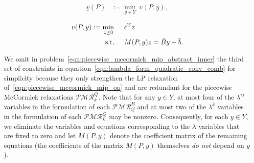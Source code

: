 \documentclass{article}
\newcommand{\pmc}{piecewise McCormick}
\begin{document}
\noindent
\begin{minipage}{0.2\linewidth}
\vspace*{0.5in}
\end{minipage}%
\hspace*{0.75in}
\begin{minipage}{0.3\linewidth}
\vspace*{-0.2in}
\begin{align}
\label{eqn:piecewise_mccormick_mip_abstract}
\underline{v}(P) &:= \min_{y \in Y} \: v(P,y),
\end{align}
\end{minipage}%
\hspace*{0.1in}
\begin{minipage}{0.45\linewidth}
\begin{alignat}{2}
\label{eqn:piecewise_mccormick_mip_abstract_inner}
v(P,y) &:= \min_{z \geq 0} \:\: && \bar{c}^{\textup{T}} z \\
&\quad\quad \text{s.t.} \:\: && M(P,y) z = \bar{B} y + \bar{b}. \nonumber
\end{alignat}
\end{minipage}

\vspace*{0.1in}
\noindent We omit in problem~\eqref{eqn:piecewise_mccormick_mip_abstract_inner} the third set of constraints in equation~\eqref{eqn:lambda_form_quadratic_conv_comb} for simplicity because they only strengthen the LP relaxation of~\eqref{eqn:piecewise_mccormick_mip_oa} and are redundant for the {\pmc} relaxations $\mathcal{PMR}^Q_k$.
Note that for any $y \in Y$, at most four of the $\lambda^{ij}$ variables in the formulation of each $\mathcal{PMR}^B_{ij}$ and at most two of the $\lambda^k$ variables in the formulation of each $\mathcal{PMR}^Q_k$ may be nonzero.
Consequently, for each $y \in Y$, we eliminate the variables and equations corresponding to the $\lambda$ variables that are fixed to zero and let $M(P,y)$ denote the coefficient matrix of the remaining equations (the coefficients of the matrix $M(P,y)$ themselves \textit{do not} depend on $y$).
\end{document}
